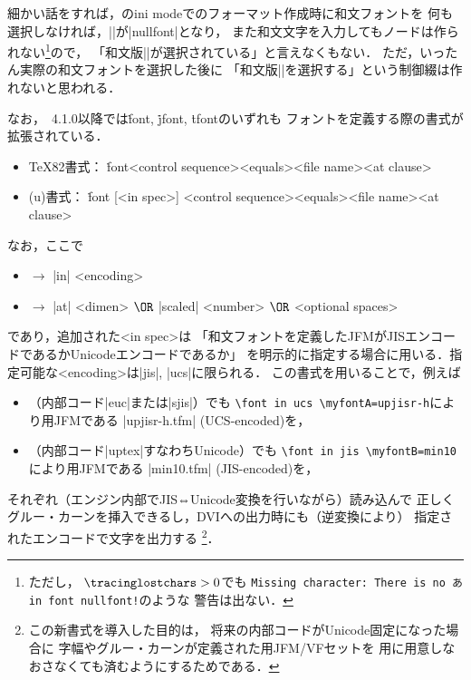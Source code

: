 \documentclass[a4paper,11pt,nomag,dvipdfmx]{jsarticle}
\def\code#1{\texttt{#1}}
\def\_{\leavevmode\vrule width .45em height -.2ex depth .3ex\relax}
\begin{document}
\begin{dangerous}
  細かい話をすれば，\pTeX のini modeでのフォーマット作成時に和文フォントを
  何も選択しなければ，|\fontname\jfont|が|nullfont|となり，
  また和文文字を入力してもノードは作られない\footnote{ただし，
  $\.{tracinglostchars}>0$でも
  \code{Missing character: There is no あ in font nullfont!}のような
  警告は出ない．}ので，
  「和文版|\nullfont|が選択されている」と言えなくもない．
  ただ，いったん実際の和文フォントを選択した後に
  「和文版|\nullfont|を選択する」という制御綴は作れないと思われる．
\end{dangerous}

なお，\pTeX~4.1.0以降では\.{font}, \.{jfont}, \.{tfont}のいずれも
フォントを定義する際の書式が拡張されている．
\begin{itemize}
 \item \TeX82書式：
   \.{font}<control sequence><equals><file name><at clause>
 \item (u)\pTeX 書式：
   \.{font} [<in spec>] <control sequence><equals><file name><at clause>
\end{itemize}
なお，ここで
\begin{itemize}
 \item <in spec> $\longrightarrow$ |in| <encoding>
 \item <at clause> $\longrightarrow$ |at| <dimen> $\OR$ |scaled| <number> $\OR$ <optional spaces>
\end{itemize}
であり，追加された<in spec>は
「和文フォントを定義したJFMがJISエンコードであるかUnicodeエンコードであるか」
を明示的に指定する場合に用いる．指定可能な<encoding>は|jis|, |ucs|に限られる．
この書式を用いることで，例えば
\begin{itemize}
 \item \pTeX（内部コード|euc|または|sjis|）でも
   \verb|\font in ucs \myfontA=upjisr-h|により\upTeX 用JFMである
   |upjisr-h.tfm| (UCS-encoded)を，
 \item \upTeX（内部コード|uptex|すなわちUnicode）でも
   \verb|\font in jis \myfontB=min10|により\pTeX 用JFMである
   |min10.tfm| (JIS-encoded)を，
\end{itemize}
それぞれ（エンジン内部でJIS⇔Unicode変換を行いながら）読み込んで
正しくグルー・カーンを挿入できるし，DVIへの出力時にも（逆変換により）
指定されたエンコードで文字を出力する
\footnote{この新書式を導入した目的は，
将来\upTeX の内部コードがUnicode固定になった場合に
字幅やグルー・カーンが定義された\pTeX 用JFM/VFセットを
\upTeX 用に用意しなおさなくても済むようにするためである\cite{tjb149}．}．
\end{document}
